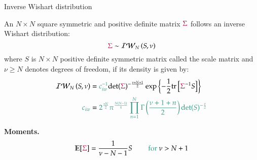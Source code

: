 \documentclass[notes,blackandwhite,mathsans,usenames,dvipsnames]{beamer}
\begin{document}
\begin{frame}{Inverse Wishart distribution}

{\color{mcxs2}An} $N\times N$ {\color{mcxs2}square symmetric and positive definite matrix} ${\color{purple}\Sigma}$ {\color{mcxs2}follows an} {\color{mcxs1}inverse Wishart} {\color{mcxs2}distribution:}
$$ {\color{purple}\Sigma} \sim \mathcal{IW}_{N}\left( S, \nu \right) $$ 
{\color{mcxs2}where} $S$ {\color{mcxs2}is} $N\times N$ {\color{mcxs2}positive definite symmetric matrix called the scale matrix and} $\nu \geq N$ {\color{mcxs2}denotes degrees of freedom, if its density is given by:}
\begin{align*}
\mathcal{IW}_{N}\left( S, \nu \right) &= {\color{mcxs2}c_{iw}^{-1}}\text{det}({\color{purple}\Sigma})^{-\frac{\nu+N+1}{2}}\exp\left\{ -\frac{1}{2}\text{tr}\left[ {\color{purple}\Sigma}^{-1} S \right] \right\}\\
{\color{mcxs2}c_{iw}} &= {\color{mcxs2}2^{\frac{\nu N}{2}}\pi^{\frac{N(N-1)}{4}}\prod_{n=1}^{N}\Gamma\left(\frac{\nu + 1+n}{2}\right)\text{det}(S)^{-\frac{\nu}{2}}}
\end{align*}

\smallskip\textbf{Moments.}
$$ \mathbb{E}[{\color{purple}\Sigma}] = \frac{1}{\nu-N-1} S \qquad\text{ {\color{mcxs2}for} }\nu>N+1$$

\end{frame}
\end{document}
